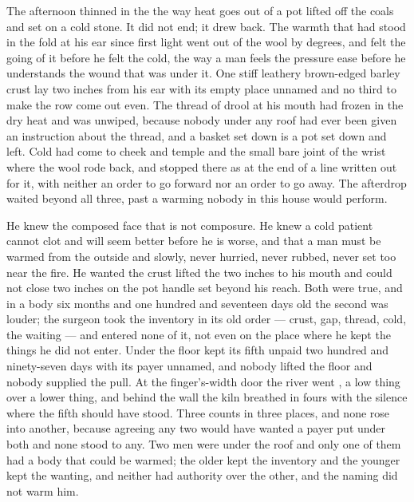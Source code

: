 The afternoon thinned in the  the way heat goes out of a pot lifted off the coals and set on a cold stone. It did not end; it drew back. The warmth that had stood in the fold at his ear since first light went out of the wool by degrees, and  felt the going of it before he felt the cold, the way a man feels the pressure ease before he understands the wound that was under it. One stiff leathery brown-edged barley crust lay two inches from his ear with its empty place unnamed and no third to make the row come out even. The thread of drool at his mouth had frozen in the dry heat and was unwiped, because nobody under any roof had ever been given an instruction about the thread, and a basket set down is a pot set down and left. Cold had come to cheek and temple and the small bare joint of the wrist where the wool rode back, and stopped there as at the end of a line written out for it, with neither an order to go forward nor an order to go away. The afterdrop waited beyond all three, past a warming nobody in this house would perform.

He knew the composed face that is not composure. He knew a cold patient cannot clot and will seem better before he is worse, and that a man must be warmed from the outside and slowly, never hurried, never rubbed, never set too near the fire. He wanted the crust lifted the two inches to his mouth and could not close two inches on the pot handle set beyond his reach. Both were true, and in a body six months and one hundred and seventeen days old the second was louder; the surgeon took the inventory in its old order --- crust, gap, thread, cold, the waiting --- and entered none of it, not even on the place where he kept the things he did not enter. Under the floor  kept its fifth unpaid two hundred and ninety-seven days with its payer unnamed, and nobody lifted the floor and nobody supplied the pull. At the finger's-width door the river went , a low thing over a lower thing, and behind the wall the kiln breathed in fours with the silence where the fifth should have stood. Three counts in three places, and none rose into another, because agreeing any two would have wanted a payer put under both and none stood to any. Two men were under the roof and only one of them had a body that could be warmed; the older kept the inventory and the younger kept the wanting, and neither had authority over the other, and the naming did not warm him.

